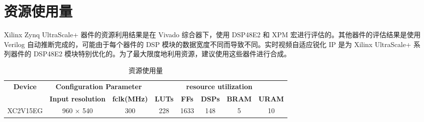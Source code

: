 \documentclass[12pt, a4paper, oneside]{ctexbook}
\begin{document}
	\section{资源使用量}	
	Xilinx Zynq UltraScale+ 器件的资源利用结果是在 Vivado 综合器下，使用 DSP48E2 和 XPM 宏进行评估的。其他器件的评估结果是使用 Verilog 自动推断完成的，可能由于每个器件的 DSP 模块的数据宽度不同而导致不同。实时视频自适应锐化 IP 是为 Xilinx UltraScale+ 系列器件的 DSP48E2 模块特别优化的。为了最大限度地利用资源，建议使用这些器件进行合成。
	\begin{table}[h]
		\centering
		\begin{tabular}{|c|cc|ccccc|}
			\hline
			\multirow{2}{*}{\textbf{Device}} & \multicolumn{2}{c|}{\textbf{Configuration Parameter}}               & \multicolumn{5}{c|}{\textbf{resource utilization}}                                                                                                               \\ \cline{2-8} 
			& \multicolumn{1}{c|}{\textbf{Input resolution}} & \textbf{fclk(MHz)} & \multicolumn{1}{c|}{\textbf{LUTs}} & \multicolumn{1}{c|}{\textbf{FFs}} & \multicolumn{1}{c|}{\textbf{DSPs}} & \multicolumn{1}{c|}{\textbf{BRAM}} & \textbf{URAM} \\ \hline
			XC2V15EG                         & \multicolumn{1}{c|}{960 × 540}                 & 300                & \multicolumn{1}{c|}{228}           & \multicolumn{1}{c|}{1633}         & \multicolumn{1}{c|}{148}           & \multicolumn{1}{c|}{5}             & 10            \\ \hline
		\end{tabular}
	\caption{资源使用量}
	\end{table}
	
\end{document}
